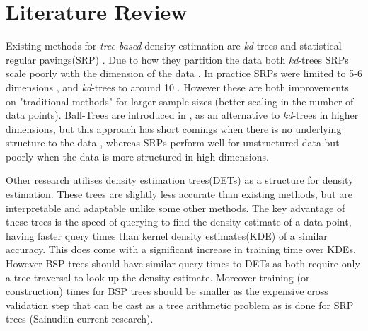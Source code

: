 \documentclass[a4paper, 10pt]{report} %
\begin{document}






\section*{Literature Review}


Existing methods for \textit{tree-based} density estimation are \textit{kd}-trees\cite{gray2003nonparametric} and statistical regular pavings(SRP) \cite{sainudiin2013posterior}.
Due to how they partition the data both \textit{kd}-trees SRPs scale poorly with the dimension of the data \cite{gray2003nonparametric}. In practice SRPs were limited to 5-6 dimensions \cite{teng2014l1}, and \textit{kd}-trees to around 10 \cite{gray2003nonparametric}. However these are both improvements on "traditional methods" for larger sample sizes (better scaling in the number of data points). Ball-Trees are introduced in \cite{gray2003nonparametric}, as an alternative to \textit{kd}-trees in higher dimensions, but this approach has short comings when there is no underlying structure to the data \cite{Lang:2005,Moore00theanchors}, whereas SRPs perform well for unstructured data \cite{sainudiin2013posterior} but poorly when the data is more structured in high dimensions.

Other research utilises density estimation trees(DETs) \cite{Ram:2011:DET:2020408.2020507} as a structure for density estimation. These trees are slightly less accurate than existing methods, but are interpretable and adaptable unlike some other methods. The key advantage of these trees is the speed of querying to find the density estimate of a data point, having faster query times than kernel density estimates(KDE) of a similar accuracy. This does come with a significant increase in training time over KDEs. However BSP trees should have similar query times to DETs as both require only a tree traversal to look up the density estimate. Moreover training (or construction) times for BSP trees should be smaller as the expensive cross validation step that can be cast as a tree arithmetic problem as is done for SRP trees (Sainudiin current research).
\end{document}
